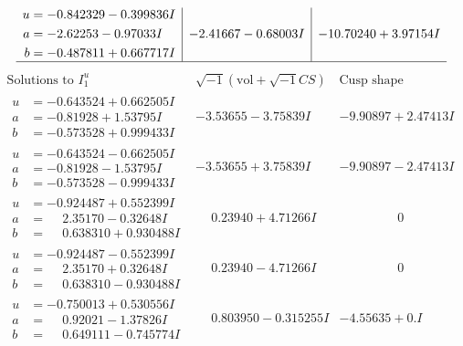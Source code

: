 \documentclass[1p]{elsarticle_modified}
\theoremstyle{definition}
\newcommand{\I}{\sqrt{-1}}
\begin{document}
$$\begin{array}{c|c|c}
\begin{aligned}
u &= -0.842329 - 0.399836 I \\
a &= -2.62253 - 0.97033 I \\
b &= -0.487811 + 0.667717 I\end{aligned}
 & -2.41667 - 0.68003 I & -10.70240 + 3.97154 I\\
 \hline 
 \end{array}$$\newpage$$\begin{array}{c|c|c}  
\text{Solutions to }I^u_{1}& \I (\text{vol} + \sqrt{-1}CS) & \text{Cusp shape}\\
 \hline 
\begin{aligned}
u &= -0.643524 + 0.662505 I \\
a &= -0.81928 + 1.53795 I \\
b &= -0.573528 + 0.999433 I\end{aligned}
 & -3.53655 - 3.75839 I & -9.90897 + 2.47413 I \\ \hline\begin{aligned}
u &= -0.643524 - 0.662505 I \\
a &= -0.81928 - 1.53795 I \\
b &= -0.573528 - 0.999433 I\end{aligned}
 & -3.53655 + 3.75839 I & -9.90897 - 2.47413 I \\ \hline\begin{aligned}
u &= -0.924487 + 0.552399 I \\
a &= \phantom{-}2.35170 - 0.32648 I \\
b &= \phantom{-}0.638310 + 0.930488 I\end{aligned}
 & \phantom{-}0.23940 + 4.71266 I & \phantom{-0.000000 } 0 \\ \hline\begin{aligned}
u &= -0.924487 - 0.552399 I \\
a &= \phantom{-}2.35170 + 0.32648 I \\
b &= \phantom{-}0.638310 - 0.930488 I\end{aligned}
 & \phantom{-}0.23940 - 4.71266 I & \phantom{-0.000000 } 0 \\ \hline\begin{aligned}
u &= -0.750013 + 0.530556 I \\
a &= \phantom{-}0.92021 - 1.37826 I \\
b &= \phantom{-}0.649111 - 0.745774 I\end{aligned}
 & \phantom{-}0.803950 - 0.315255 I & -4.55635 + 0. I\phantom{ +0.000000I} \\ \hline\begin{aligned}

\end{aligned}
\end{array}$$
\end{document}
